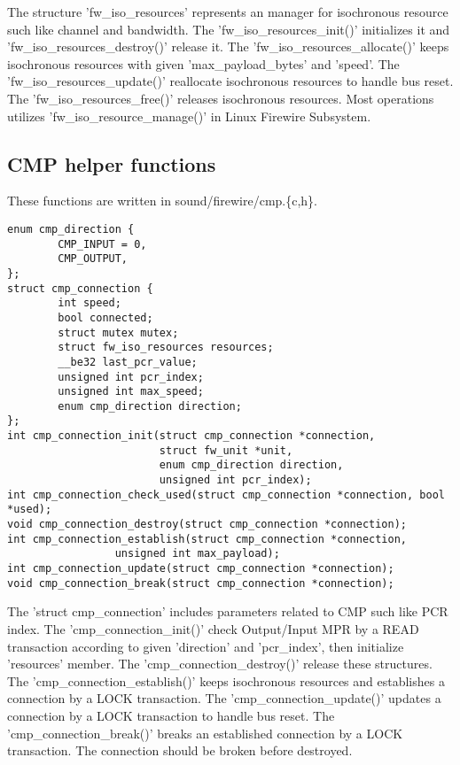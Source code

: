 \documentclass[onecolumn]{article}
\begin{document}
The structure 'fw\_iso\_resources' represents an manager for isochronous resource such like channel and bandwidth. The 'fw\_iso\_resources\_init()' initializes it and 'fw\_iso\_resources\_destroy()' release it.
The 'fw\_iso\_resources\_allocate()' keeps isochronous resources with given 'max\_payload\_bytes' and 'speed'. The 'fw\_iso\_resources\_update()' reallocate isochronous resources to handle bus reset. The 'fw\_iso\_resources\_free()' releases isochronous resources. Most operations utilizes 'fw\_iso\_resource\_manage()' in Linux Firewire Subsystem.

\subsection{CMP helper functions}

These functions are written in sound/firewire/cmp.\{c,h\}.

\begin{verbatim}
enum cmp_direction {
        CMP_INPUT = 0,
        CMP_OUTPUT,
};
struct cmp_connection {
        int speed;
        bool connected;
        struct mutex mutex;
        struct fw_iso_resources resources;
        __be32 last_pcr_value;
        unsigned int pcr_index;
        unsigned int max_speed;
        enum cmp_direction direction;
};
int cmp_connection_init(struct cmp_connection *connection,
                        struct fw_unit *unit,
                        enum cmp_direction direction,
                        unsigned int pcr_index);
int cmp_connection_check_used(struct cmp_connection *connection, bool *used);
void cmp_connection_destroy(struct cmp_connection *connection);
int cmp_connection_establish(struct cmp_connection *connection,
			     unsigned int max_payload);
int cmp_connection_update(struct cmp_connection *connection);
void cmp_connection_break(struct cmp_connection *connection);
\end{verbatim}

The 'struct cmp\_connection' includes parameters related to CMP such like PCR index. The 'cmp\_connection\_init()' check Output/Input MPR by a READ transaction according to given 'direction' and 'pcr\_index', then initialize 'resources' member. The 'cmp\_connection\_destroy()' release these structures. The 'cmp\_connection\_establish()' keeps isochronous resources and establishes a connection by a LOCK transaction. The 'cmp\_connection\_update()' updates a connection by a LOCK transaction to handle bus reset. The 'cmp\_connection\_break()' breaks an established connection by a LOCK transaction. The connection should be broken before destroyed.
\end{document}
